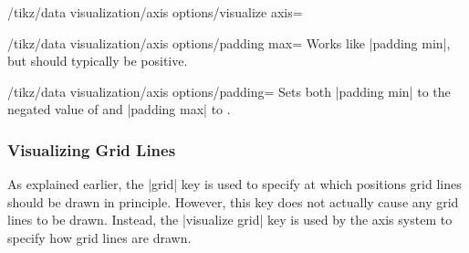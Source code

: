 \begin{key}{/tikz/data visualization/axis options/visualize axis=}
    \begin{key}{/tikz/data visualization/axis options/padding max=}
        Works like |padding min|, but  should typically be
        positive.
    \end{key}

    \begin{key}{/tikz/data visualization/axis options/padding=}
        Sets both |padding min| to the negated value of  and
        |padding max| to .
    \end{key}
\end{key}


\subsubsection{Visualizing Grid Lines}
\label{section-dv-visualize-gridlines}

As explained earlier, the |grid| key is used to specify at which positions grid
lines should be drawn in principle. However, this key does not actually cause
any grid lines to be drawn. Instead, the |visualize grid| key is used by the
axis system to specify how grid lines are drawn.

